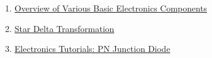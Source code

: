 \begin{enumerate}

\item \href{https://www.elprocus.com/major-electronic-components/}{Overview of Various Basic Electronics Components}

\item \href{https://www.electronics-tutorials.ws/dccircuits/dcp_10.html}{Star Delta Transformation}

\item \href{https://www.electronics-tutorials.ws/diode/diode_3.html}{Electronics Tutorials: PN Junction Diode}

\end{enumerate}


\newpage